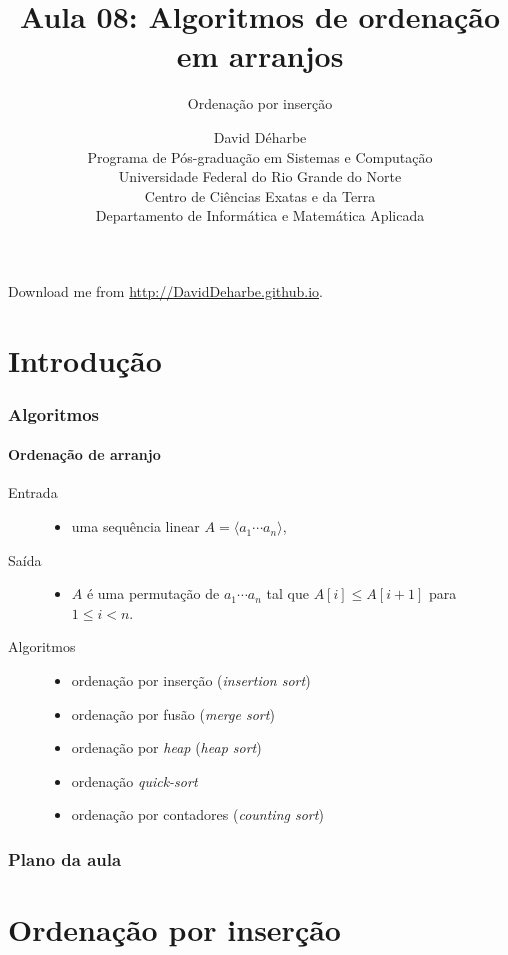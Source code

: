 \documentclass{beamer}
\title{Aula 08: Algoritmos de ordenação em arranjos}
\subtitle{Ordenação por inserção}
\author{David Déharbe \\
  Programa de Pós-graduação em Sistemas e Computação \\
  Universidade Federal do Rio Grande do Norte \\
  Centro de Ciências Exatas e da Terra \\
  Departamento de Informática e Matemática Aplicada}
\date{}
\begin{document}
\begin{frame}
  \titlepage
  Download me from \url{http://DavidDeharbe.github.io}.
\end{frame}

\section{Introdução}

\begin{frame}

  \frametitle{Algoritmos}
  \framesubtitle{Ordenação de arranjo}

  \begin{description}
    \item[Entrada]
      \begin{itemize}
        \item uma sequência linear $A = \langle a_1 \cdots a_n \rangle$,
      \end{itemize}
    \item[Saída] 
      \begin{itemize}
        \item $A$ é uma permutação de $a_1 \cdots a_n$ tal que 
          $A[i] \le A[i+1]$ para $1 \le i < n$.
      \end{itemize}
    \item[Algoritmos]
      \begin{itemize}
      \item ordenação por inserção (\textit{insertion sort})
      \item ordenação por fusão (\textit{merge sort})
      \item ordenação por \textit{heap} (\textit{heap sort})
      \item ordenação \textit{quick-sort}
      \item ordenação por contadores (\textit{counting sort})
      \end{itemize}
  \end{description}

\end{frame}

\begin{frame}
  \frametitle{Plano da aula}
  \tableofcontents
\end{frame}

\section{Ordenação por inserção}
\end{document}
